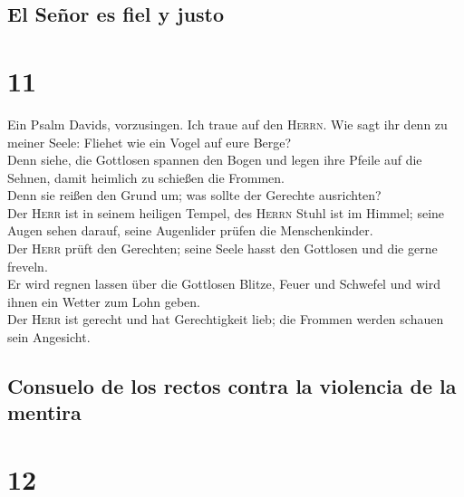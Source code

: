 \hypertarget{el-seuxf1or-es-fiel-y-justo}{%
\subsection{El Señor es fiel y
justo}\label{el-seuxf1or-es-fiel-y-justo}}

\hypertarget{section-10}{%
\section{11}\label{section-10}}

 Ein Psalm Davids, vorzusingen. Ich traue auf den
\textsc{Herrn}. Wie sagt ihr denn zu meiner Seele: Fliehet wie ein Vogel
auf eure Berge?\\
 Denn siehe, die Gottlosen spannen den Bogen und legen
ihre Pfeile auf die Sehnen, damit heimlich zu schießen die Frommen.\\
 Denn sie reißen den Grund um; was sollte der Gerechte
ausrichten?\\
 Der \textsc{Herr} ist in seinem heiligen Tempel, des
\textsc{Herrn} Stuhl ist im Himmel; seine Augen sehen darauf, seine
Augenlider prüfen die Menschenkinder.\\
 Der \textsc{Herr} prüft den Gerechten; seine Seele hasst
den Gottlosen und die gerne freveln.\\
 Er wird regnen lassen über die Gottlosen Blitze, Feuer
und Schwefel und wird ihnen ein Wetter zum Lohn geben.\\
 Der \textsc{Herr} ist gerecht und hat Gerechtigkeit lieb;
die Frommen werden schauen sein Angesicht.

\hypertarget{consuelo-de-los-rectos-contra-la-violencia-de-la-mentira}{%
\subsection{Consuelo de los rectos contra la violencia de la
mentira}\label{consuelo-de-los-rectos-contra-la-violencia-de-la-mentira}}

\hypertarget{section-11}{%
\section{12}\label{section-11}}

